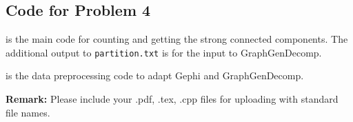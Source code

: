 \documentclass[12pt,a4paper]{article}
\theoremstyle{definition}
\begin{document}
\begin{appendix}
\section{Code for Problem 4}
 is the main code for counting and getting the strong connected components. The additional output to \texttt{partition.txt} is for the input to GraphGenDecomp.
\begin{multicols}{2}

\end{multicols}
 is the data preprocessing code to adapt Gephi and GraphGenDecomp.
\begin{multicols}{2}

\end{multicols}
\end{appendix}

\textbf{Remark:} Please include your .pdf, .tex, .cpp files for uploading with standard file names.
\newpage


\end{document}
